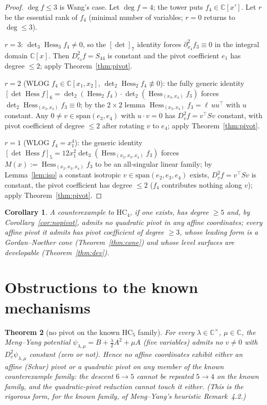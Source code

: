 \documentclass[11pt]{article}
\theoremstyle{plain}
\newtheorem{theorem}{Theorem}[section]
\newtheorem{corollary}[theorem]{Corollary}
\theoremstyle{definition}
\newcommand{\C}{\mathbb{C}}
\newcommand{\Hess}{\operatorname{Hess}}
\newcommand{\HC}{\mathrm{HC}}
\begin{document}
\begin{proof}
$\deg f\le3$ is Wang's case. Let $\deg f=4$; the tower puts
$f_4\in\C[x']$. Let $r$ be the essential rank of $f_4$ (minimal number of
variables; $r=0$ returns to $\deg\le3$).

$r=3$: $\det_3\Hess_3f_4\ne0$, so the $[\det]_7$ identity forces
$\partial_{x_4}^2f_3\equiv0$ in the integral domain $\C[x]$. Then
$D_{e_4}^2f=S_{44}$ is constant and the pivot coefficient
$e_1$ has degree $\le2$; apply Theorem~\ref{thm:pivot}.

$r=2$ (WLOG $f_4\in\C[x_1,x_2]$, $\det_2\Hess_2f_4\not\equiv0$): the fully
generic identity $[\det\Hess f]_6=\det_2(\Hess_2f_4)\cdot
\det_2(\Hess_{(x_3,x_4)}f_3)$ forces
$\det_2\Hess_{(x_3,x_4)}f_3\equiv0$; by the $2\times2$ lemma
$\Hess_{(x_3,x_4)}f_3=\ell\,uu^\top$ with $u$ constant. Any
$0\ne v\in\mathrm{span}(e_3,e_4)$ with $u\cdot v=0$ has $D_v^2f=v^\top
Sv$ constant, with pivot coefficient of degree $\le2$ after rotating $v$
to $e_4$; apply Theorem~\ref{thm:pivot}.

$r=1$ (WLOG $f_4=x_1^4$): the generic identity
$[\det\Hess f]_5=12x_1^2\det_3(\Hess_{(x_2,x_3,x_4)}f_3)$ forces
$M(x):=\Hess_{(x_2,x_3,x_4)}f_3$ to be an all-singular linear family; by
Lemma~\ref{lem:iso} a constant isotropic $v\in\mathrm{span}(e_2,e_3,e_4)$
exists, $D_v^2f=v^\top Sv$ is constant, the pivot coefficient has degree
$\le2$ ($f_4$ contributes nothing along $v$); apply
Theorem~\ref{thm:pivot}.
\end{proof}

\begin{corollary}
A counterexample to $\HC_4$, if one exists, has degree $\ge5$ and, by
Corollary~\ref{cor:nopivot}, admits no quadratic pivot in any affine
coordinates; every affine pivot it admits has pivot coefficient of degree
$\ge3$, whose leading form is a Gordan--Noether cone
(Theorem~\ref{thm:cone}) and whose level surfaces are developable
(Theorem~\ref{thm:dev}).
\end{corollary}

\section{Obstructions to the known mechanisms}

\begin{theorem}[no pivot on the known $\HC_5$ family]\label{thm:d1}
For every $\lambda\in\C^\times$, $\mu\in\C$, the Meng--Yang potential
$\psi_{\lambda,\mu}=B+\tfrac\lambda2A^2+\mu A$ (five variables) admits no
$v\ne0$ with $D_v^2\psi_{\lambda,\mu}$ constant (zero or not). Hence no
affine coordinates exhibit either an affine (Schur) pivot or a quadratic
pivot on any member of the known counterexample family: the descent
$6\to5$ cannot be repeated $5\to4$ on the known family, and the
quadratic-pivot reduction cannot touch it either. \emph{(This is the
rigorous form, for the known family, of Meng--Yang's heuristic
Remark~4.2.)}
\end{theorem}
\end{document}
